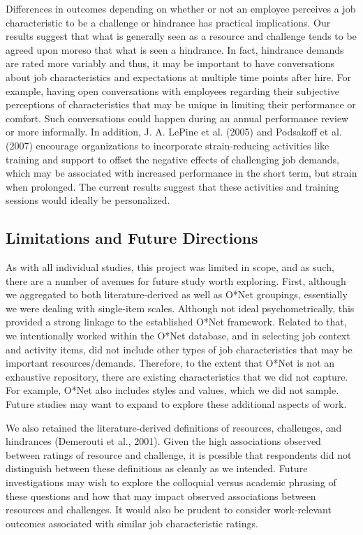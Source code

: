 \documentclass[
  english,
  man]{apa6}
\begin{document}
Differences in outcomes depending on whether or not an employee perceives a job characteristic to be a challenge or hindrance has practical implications. Our results suggest that what is generally seen as a resource and challenge tends to be agreed upon moreso that what is seen a hindrance. In fact, hindrance demands are rated more variably and thus, it may be important to have conversations about job characteristics and expectations at multiple time points after hire. For example, having open conversations with employees regarding their subjective perceptions of characteristics that may be unique in limiting their performance or comfort. Such conversations could happen during an annual performance review or more informally. In addition, J. A. LePine et al. (2005) and Podsakoff et al. (2007) encourage organizations to incorporate strain-reducing activities like training and support to offset the negative effects of challenging job demands, which may be associated with increased performance in the short term, but strain when prolonged. The current results suggest that these activities and training sessions would ideally be personalized.

\hypertarget{limitations-and-future-directions}{%
\subsection{Limitations and Future Directions}\label{limitations-and-future-directions}}

As with all individual studies, this project was limited in scope, and as such, there are a number of avenues for future study worth exploring. First, although we aggregated to both literature-derived as well as O*Net groupings, essentially we were dealing with single-item scales. Although not ideal psychometrically, this provided a strong linkage to the established O*Net framework. Related to that, we intentionally worked within the O*Net database, and in selecting job context and activity items, did not include other types of job characteristics that may be important resources/demands. Therefore, to the extent that O*Net is not an exhaustive repository, there are existing characteristics that we did not capture. For example, O*Net also includes styles and values, which we did not sample. Future studies may want to expand to explore these additional aspects of work.

We also retained the literature-derived definitions of resources, challenges, and hindrances (Demerouti et al., 2001). Given the high associations observed between ratings of resource and challenge, it is possible that respondents did not distinguish between these definitions as cleanly as we intended. Future investigations may wish to explore the colloquial versus academic phrasing of these questions and how that may impact observed associations between resources and challenges. It would also be prudent to consider work-relevant outcomes associated with similar job characteristic ratings.
\end{document}
